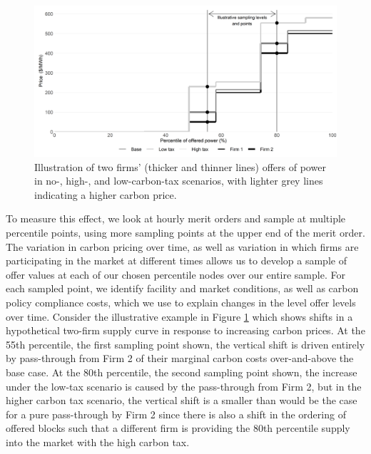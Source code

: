 \documentclass[12pt]{article}
\begin{document}
\begin{figure}[t]
    \centering
    \begin{minipage}{\textwidth}
        \centering
        \includegraphics[width=.9\textwidth]{../images/sampling.png}
        \caption{Illustration of two firms' (thicker and thinner lines) offers of power in no-, high-, and low-carbon-tax scenarios, with lighter grey lines indicating a higher carbon price.}
    \label{fig:synth_illust}
    \end{minipage}%
\end{figure}

To measure this effect, we look at hourly merit orders and sample at multiple percentile points, using more sampling points at the upper end of the merit order. The variation in carbon pricing over time, as well as variation in which firms are participating in the market at different times allows us to develop a sample of offer values at each of our chosen percentile nodes over our entire sample. For each sampled point, we identify facility and market conditions, as well as carbon policy compliance costs, which we use to explain changes in the level offer levels over time. Consider the illustrative example in Figure \ref{fig:synth_illust} which shows shifts in a hypothetical two-firm supply curve in response to increasing carbon prices. At the 55th percentile, the first sampling point shown, the vertical shift is driven entirely by pass-through from Firm 2 of their marginal carbon costs over-and-above the base case. At the 80th percentile, the second sampling point shown, the increase under the low-tax scenario is caused by the pass-through from Firm 2, but in the higher carbon tax scenario, the vertical shift is a smaller than would be the case for a pure pass-through by Firm 2 since there is also a shift in the ordering of offered blocks such that a different firm is providing the 80th percentile supply into the market with the high carbon tax.
\end{document}
